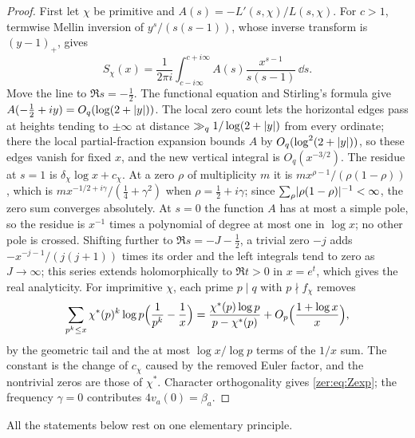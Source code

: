 \begin{proof}
First let $\chi$ be primitive and $A(s)=-L'(s,\chi)/L(s,\chi)$. For $c>1$, termwise Mellin
inversion of $y^s/(s(s-1))$, whose inverse transform is $(y-1)_+$, gives
\[
 S_\chi(x)=\frac1{2\pi i}\int_{c-i\infty}^{c+i\infty}A(s)\frac{x^{s-1}}{s(s-1)}\,\dd s .
\]
Move the line to $\Re s=-\tfrac12$. The functional equation and Stirling's formula give
$A(-\tfrac12+iy)=O_q(\log(2+\lvert y\rvert))$. The local zero count lets the horizontal edges pass at
heights tending to $\pm\infty$ at distance $\gg_q1/\log(2+\lvert y\rvert)$ from every ordinate; there
the local partial-fraction expansion bounds $A$ by $O_q(\log^2(2+\lvert y\rvert))$, so these edges
vanish for fixed $x$, and the new vertical integral is $O_q(x^{-3/2})$. The residue at $s=1$
is $\delta_\chi\log x+c_\chi$. At a zero $\rho$ of multiplicity $m$ it is
$mx^{\rho-1}/(\rho(1-\rho))$, which is $mx^{-1/2+i\gamma}/(\tfrac14+\gamma^2)$ when
$\rho=\tfrac12+i\gamma$; since $\sum_\rho\lvert\rho(1-\rho)\rvert^{-1}<\infty$, the zero sum converges
absolutely. At $s=0$ the function $A$
has at most a simple pole, so the residue is $x^{-1}$ times a polynomial of degree at most one
in $\log x$; no other pole is crossed. Shifting further to $\Re s=-J-\tfrac12$, a trivial zero
$-j$ adds $-x^{-j-1}/(j(j+1))$ times its order and the left integrals tend to zero as
$J\to\infty$; this series extends holomorphically to $\Re t>0$ in $x=e^t$, which gives the real
analyticity. For imprimitive $\chi$, each prime $p\mid q$ with
$p\nmid f_\chi$ removes
\[
 \sum_{p^k\le x}\chi^*(p)^k\log p\Bigl(\frac1{p^k}-\frac1x\Bigr)
 =\frac{\chi^*(p)\log p}{p-\chi^*(p)}+O_p\Bigl(\frac{1+\log x}x\Bigr),
\]
by the geometric tail and the at most $\log x/\log p$ terms of the $1/x$ sum. The constant is
the change of $c_\chi$ caused by the removed Euler factor, and the nontrivial zeros are those
of $\chi^*$. Character orthogonality gives \eqref{zer:eq:Zexp}; the frequency $\gamma=0$
contributes $4v_a(0)=\beta_a$.
\end{proof}

All the statements below rest on one elementary principle.

